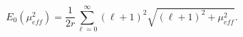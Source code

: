 \begin{equation}
E_{0}\left(\mu _{eff}^{2}\right)=\frac{1}{2r}\sum _{\ell =0}^{\infty }\left(\ell +1\right)^{2}\sqrt{\left(\ell +1\right)^{2}+\mu _{eff}^{2}}.\label{zero-point energy}\end{equation}

